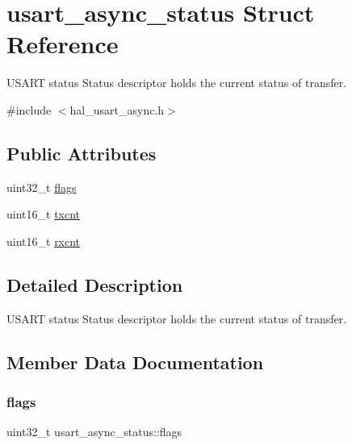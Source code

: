 \hypertarget{structusart__async__status}{}\section{usart\+\_\+async\+\_\+status Struct Reference}
\label{structusart__async__status}


U\+S\+A\+RT status Status descriptor holds the current status of transfer.  




{\ttfamily \#include $<$hal\+\_\+usart\+\_\+async.\+h$>$}

\subsection*{Public Attributes}
\begin{DoxyCompactItemize}
\item 
uint32\+\_\+t \hyperlink{structusart__async__status_a6d85ac04ed76a86bb9c49bb45a848d9a}{flags}
\item 
uint16\+\_\+t \hyperlink{structusart__async__status_a5680433094528c4ff7bcd49fba77e970}{txcnt}
\item 
uint16\+\_\+t \hyperlink{structusart__async__status_ac32698399322fed11e6914cbd88f5ee5}{rxcnt}
\end{DoxyCompactItemize}


\subsection{Detailed Description}
U\+S\+A\+RT status Status descriptor holds the current status of transfer. 

\subsection{Member Data Documentation}
\mbox{\label{structusart__async__status_a6d85ac04ed76a86bb9c49bb45a848d9a}} 
\subsubsection{\texorpdfstring{flags}{flags}}
{\footnotesize\ttfamily uint32\+\_\+t usart\+\_\+async\+\_\+status\+::flags}

